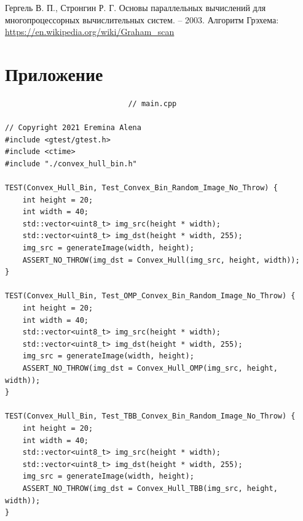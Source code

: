 \documentclass{report}
\begin{document}
\begin{thebibliography}{1}
Гергель В. П., Стронгин Р. Г. Основы параллельных вычислений для многопроцессорных вычислительных систем. – 2003.
Алгоритм Грэхема: \url {https://en.wikipedia.org/wiki/Graham_scan }
\end{thebibliography}
\newpage

\section*{Приложение}
\begin{lstlisting}
							// main.cpp

// Copyright 2021 Eremina Alena
#include <gtest/gtest.h>
#include <ctime>
#include "./convex_hull_bin.h"

TEST(Convex_Hull_Bin, Test_Convex_Bin_Random_Image_No_Throw) {
    int height = 20;
    int width = 40;
    std::vector<uint8_t> img_src(height * width);
    std::vector<uint8_t> img_dst(height * width, 255);
    img_src = generateImage(width, height);
    ASSERT_NO_THROW(img_dst = Convex_Hull(img_src, height, width));
}

TEST(Convex_Hull_Bin, Test_OMP_Convex_Bin_Random_Image_No_Throw) {
    int height = 20;
    int width = 40;
    std::vector<uint8_t> img_src(height * width);
    std::vector<uint8_t> img_dst(height * width, 255);
    img_src = generateImage(width, height);
    ASSERT_NO_THROW(img_dst = Convex_Hull_OMP(img_src, height, width));
}

TEST(Convex_Hull_Bin, Test_TBB_Convex_Bin_Random_Image_No_Throw) {
    int height = 20;
    int width = 40;
    std::vector<uint8_t> img_src(height * width);
    std::vector<uint8_t> img_dst(height * width, 255);
    img_src = generateImage(width, height);
    ASSERT_NO_THROW(img_dst = Convex_Hull_TBB(img_src, height, width));
}


\end{lstlisting}
\end{document}

